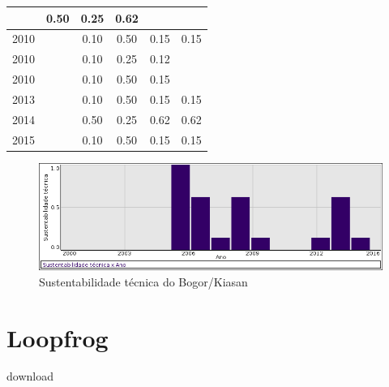 \begin{table}[H]
\begin{tabular}{| l | c | c | c | c | c |}
          &
          0.50
          &
          0.25
          &
          0.62
          &
          \\
\hline
            2010
          &
          
          &
          0.10
          &
          0.50
          &
          0.15
          &
            {\color{red} 0.15}
          \\
            2010
          &
          
          &
          0.10
          &
          0.25
          &
          0.12
          &
          \\
            2010
          &
          
          &
          0.10
          &
          0.50
          &
          0.15
          &
          \\
\hline
            2013
          &
          
          &
          0.10
          &
          0.50
          &
          0.15
          &
            {\color{red} 0.15}
          \\
\hline
            2014
          &
          
          &
          0.50
          &
          0.25
          &
          0.62
          &
            {\color{blue} 0.62}
          \\
\hline
            2015
          &
          
          &
          0.10
          &
          0.50
          &
          0.15
          &
            {\color{red} 0.15}
          \\
\hline
\end{tabular}
\end{table}

\begin{figure}[h]
  \center
  \includegraphics[scale=0.50]{imagens/softwares-charts/kiasan.png}
  \caption{Sustentabilidade técnica do Bogor/Kiasan}
\end{figure}


\section{Loopfrog}
\checkmark download


